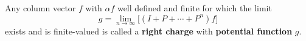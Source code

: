 Any column vector $f$ with $\alpha f$ well defined and finite for which the limit
$$g = \lim_{n \to \infty} \bigl[ (I + P + \cdots + P^n)f \bigr]$$
exists and is finite-valued is called a \textbf{right charge} with \textbf{potential function} $g$.
